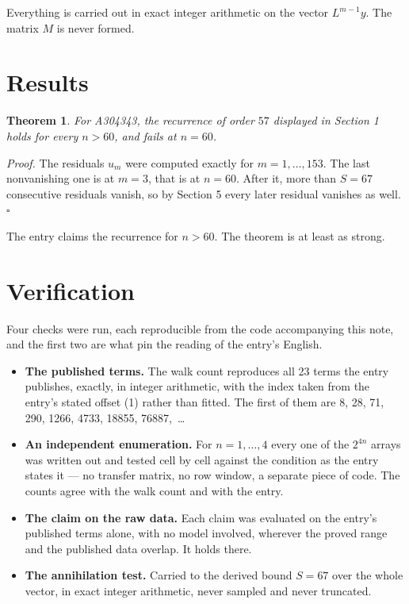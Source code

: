 \documentclass[11pt]{article}
\newtheorem{theorem}{Theorem}
\theoremstyle{definition}
\begin{document}
Everything is carried out in exact integer arithmetic on the vector $L^{m-1}y$. The matrix $M$ is never formed.

\section{Results}

\begin{theorem} For A304343, the recurrence of order $57$ displayed in Section 1 holds for every $n > 60$, and fails at $n = 60$.\end{theorem}

{\itshape Proof.} The residuals $u_m$ were computed exactly for $m = 1,\dots,153$. The last nonvanishing one is at $m = 3$, that is at $n = 60$. After it, more than $S = 67$ consecutive residuals vanish, so by Section 5 every later residual vanishes as well. $\square$

The entry claims the recurrence for $n > 60$. The theorem is at least as strong.

\section{Verification}

Four checks were run, each reproducible from the code accompanying this note, and the first two are what pin the reading of the entry's English.

\begin{itemize}

\item {\bfseries The published terms.} The walk count reproduces all 23 terms the entry publishes, exactly, in integer arithmetic, with the index taken from the entry's stated offset (1) rather than fitted. The first of them are 8, 28, 71, 290, 1266, 4733, 18855, 76887,~\dots

\item {\bfseries An independent enumeration.} For $n = 1,\dots,4$ every one of the $2^{4n}$ arrays was written out and tested cell by cell against the condition as the entry states it --- no transfer matrix, no row window, a separate piece of code. The counts agree with the walk count and with the entry.

\item {\bfseries The claim on the raw data.} Each claim was evaluated on the entry's published terms alone, with no model involved, wherever the proved range and the published data overlap. It holds there.

\item {\bfseries The annihilation test.} Carried to the derived bound $S = 67$ over the whole vector, in exact integer arithmetic, never sampled and never truncated.

\end{itemize}
\end{document}
